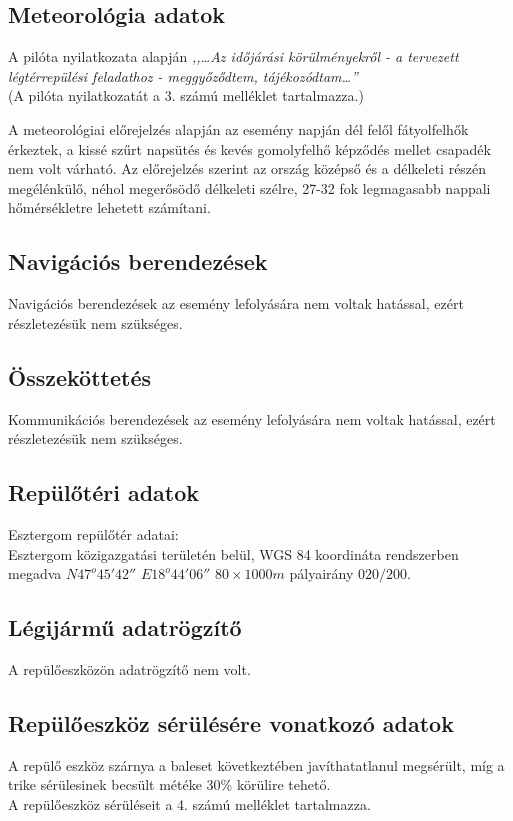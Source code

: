 \documentclass[a4paper,10pt]{article}
\begin{document}
\subsection{Meteorológia adatok}
A pilóta nyilatkozata alapján \textit{,,\dots Az időjárási körülményekről - a 
tervezett légtérrepülési feladathoz - meggyőződtem, tájékozódtam\dots ''}\\
(A pilóta nyilatkozatát a 3. számú melléklet tartalmazza.)

A meteorológiai előrejelzés alapján az esemény napján dél felől fátyolfelhők 
érkeztek, a kissé szűrt napsütés és kevés gomolyfelhő képződés mellet 
csapadék nem volt várható. Az előrejelzés szerint az ország középső és 
a délkeleti részén megélénkülő, néhol megerősödő délkeleti szélre, 27-32 
fok legmagasabb nappali hőmérsékletre lehetett számítani.

\subsection{Navigációs berendezések}
Navigációs berendezések az esemény lefolyására nem voltak hatással, ezért 
részletezésük nem szükséges.

\subsection{Összeköttetés}
Kommunikációs berendezések az esemény lefolyására nem voltak hatással, ezért 
részletezésük nem szükséges.

\subsection{Repülőtéri adatok}
Esztergom repülőtér adatai:\\
Esztergom közigazgatási területén belül, WGS 84 koordináta rendszerben megadva 
$N47^o 45' 42''$ $E18^o 44' 06''$ $80\times1000m$ pályairány $020/200$.

\subsection{Légijármű adatrögzítő}
A repülőeszközön adatrögzítő nem volt.

\subsection{Repülőeszköz sérülésére vonatkozó adatok}
A repülő eszköz szárnya a baleset következtében javíthatatlanul megsérült, míg 
a trike sérülesinek becsült météke 30\% körülire tehető.\\
A repülőeszköz sérüléseit a 4. számú melléklet tartalmazza.
\end{document}

